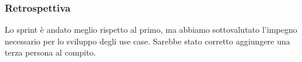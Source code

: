 \subsubsection{Retrospettiva}
Lo sprint è andato meglio rispetto al primo, ma abbiamo sottovalutato l'impegno necessario per lo sviluppo degli use case. Sarebbe stato corretto aggiungere una terza persona al compito.